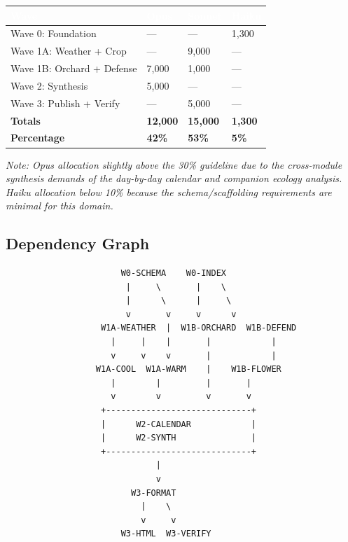 \documentclass[11pt,letterpaper]{article}
\newcommand{\tableheader}[1]{\textbf{\sffamily\textcolor{white}{#1}}}
\begin{document}
\begin{center}
\begin{tabularx}{\textwidth}{L{3.5cm}C{1.5cm}C{1.5cm}C{2cm}}
\toprule
{}
\tableheader{Wave} & \tableheader{Opus} & \tableheader{Sonnet} & \tableheader{Haiku} \\
\midrule
Wave 0: Foundation & --- & --- & 1,300 \\
Wave 1A: Weather + Crop & --- & 9,000 & --- \\
Wave 1B: Orchard + Defense & 7,000 & 1,000 & --- \\
Wave 2: Synthesis & 5,000 & --- & --- \\
Wave 3: Publish + Verify & --- & 5,000 & --- \\
\midrule
\textbf{Totals} & \textbf{12,000} & \textbf{15,000} & \textbf{1,300} \\
\textbf{Percentage} & \textbf{42\%} & \textbf{53\%} & \textbf{5\%} \\
\bottomrule
\end{tabularx}
\end{center}

\textit{Note: Opus allocation slightly above the 30\% guideline due to the cross-module synthesis demands of the day-by-day calendar and companion ecology analysis. Haiku allocation below 10\% because the schema/scaffolding requirements are minimal for this domain.}

\subsection{Dependency Graph}

\begin{asciibox}
\begin{verbatim}
                       W0-SCHEMA    W0-INDEX
                        |     \       |    \
                        |      \      |     \
                        v       v     v      v
                   W1A-WEATHER  |  W1B-ORCHARD  W1B-DEFEND
                     |     |    |       |            |
                     v     v    v       |            |
                  W1A-COOL  W1A-WARM    |    W1B-FLOWER
                     |        |         |       |
                     v        v         v       v
                   +-----------------------------+
                   |      W2-CALENDAR            |
                   |      W2-SYNTH               |
                   +-----------------------------+
                              |
                              v
                         W3-FORMAT
                           |    \
                           v     v
                       W3-HTML  W3-VERIFY
\end{verbatim}
\end{asciibox}
\end{document}
